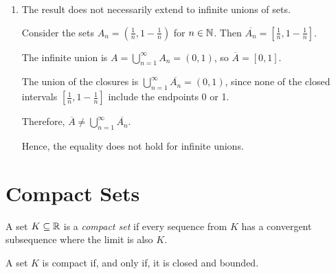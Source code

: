 {\begin{enumerate}
{            Therefore, \(\overline{A} \cup \overline{B} \subseteq \overline{A \cup B}\).

            Hence, \(\overline{A \cup B} = \overline{A} \cup \overline{B}\).

        }

        \item The result does not necessarily extend to infinite unions of sets.

        Consider the sets \(A_n = \left( \frac{1}{n}, 1 - \frac{1}{n} \right)\) for \(n \in \mathbb{N}\). Then \(\overline{A_n} = \left[ \frac{1}{n}, 1 - \frac{1}{n} \right]\).

        The infinite union is \(A = \bigcup_{n=1}^\infty A_n = (0,1)\), so \(\overline{A} = [0,1]\).

        The union of the closures is \(\bigcup_{n=1}^\infty \overline{A_n} = (0,1)\), since none of the closed intervals \(\left[ \frac{1}{n}, 1 - \frac{1}{n} \right]\) include the endpoints 0 or 1.

        Therefore, \(\overline{A} \ne \bigcup_{n=1}^\infty \overline{A_n}\).

        Hence, the equality does not hold for infinite unions.

    \end{enumerate}
}

\renewcommand{\theenumi}{\arabic{enumi}}
\renewcommand{\labelenumi}{\theenumi.}
\section{Compact Sets}

\begin{definition}
    A set \(K \subseteq \mathbb{R}\) is a \textit{compact set} if every sequence from \(K\) has a convergent subsequence where the limit is also \(K\).
\end{definition}

\begin{theorem}
    A set \(K\) is compact if, and only if, it is closed and bounded.
\end{theorem}


